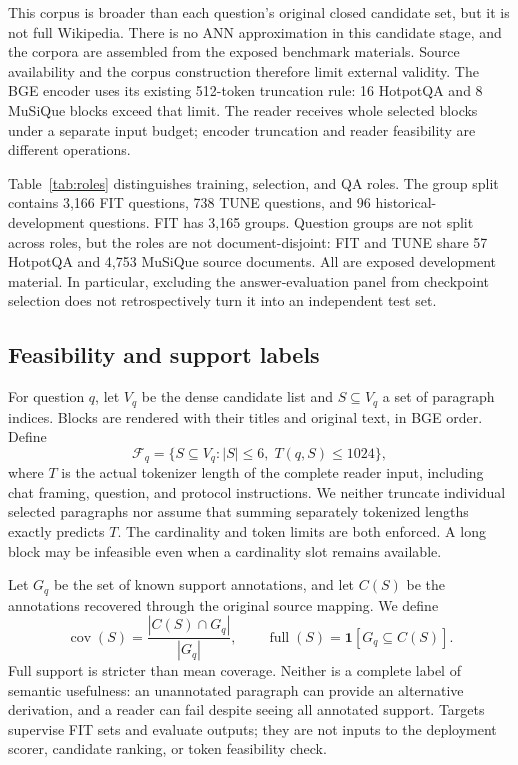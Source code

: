 \documentclass[pdflatex,sn-mathphys-num]{sn-jnl}
\begin{document}
This corpus is broader than each question's original closed candidate set,
but it is not full Wikipedia. There is no ANN approximation in this
candidate stage, and the corpora are assembled from the exposed benchmark
materials. Source availability and the corpus construction therefore limit
external validity. The BGE encoder uses its existing 512-token truncation
rule: 16 HotpotQA and 8 MuSiQue blocks exceed that limit. The reader receives
whole selected blocks under a separate input budget; encoder truncation and
reader feasibility are different operations.

Table~\ref{tab:roles} distinguishes training, selection, and QA roles.
The group split contains 3,166 FIT questions, 738 TUNE questions, and 96
historical-development questions. FIT has 3,165 groups. Question groups are
not split across roles, but the roles are not document-disjoint: FIT and TUNE
share 57 HotpotQA and 4,753 MuSiQue source documents. All are exposed
development material. In particular, excluding the answer-evaluation panel
from checkpoint selection does not retrospectively turn it into an
independent test set.


\subsection{Feasibility and support labels}
For question $q$, let $V_q$ be the dense candidate list and $S\subseteq V_q$
a set of paragraph indices. Blocks are rendered with their titles and
original text, in BGE order. Define
\begin{equation}\label{eq:feasible}
\mathcal F_q=\{S\subseteq V_q:|S|\leq6,\;T(q,S)\leq1024\},
\end{equation}
where $T$ is the actual tokenizer length of the complete reader input,
including chat framing, question, and protocol instructions. We neither
truncate individual selected paragraphs nor assume that summing separately
tokenized lengths exactly predicts $T$. The cardinality and token limits
are both enforced. A long block may be infeasible even when a cardinality
slot remains available.

Let $G_q$ be the set of known support annotations, and let $C(S)$ be the
annotations recovered through the original source mapping. We define
\begin{equation}\label{eq:labels}
\operatorname{cov}(S)=\frac{|C(S)\cap G_q|}{|G_q|},\qquad
\operatorname{full}(S)=\mathbf1[G_q\subseteq C(S)].
\end{equation}
Full support is stricter than mean coverage. Neither is a complete label of
semantic usefulness: an unannotated paragraph can provide an alternative
derivation, and a reader can fail despite seeing all annotated support.
Targets supervise FIT sets and evaluate outputs; they are not inputs to the
deployment scorer, candidate ranking, or token feasibility check.
\end{document}
